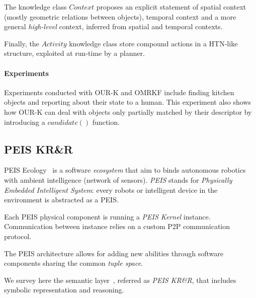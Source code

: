 The knowledge class $Context$ proposes an explicit statement of spatial context
(mostly geometric relations between objects), temporal context and a more
general \emph{high-level} context, inferred from spatial and temporal contexts.

Finally, the $Activity$ knowledge class store compound actions in a HTN-like
structure, exploited at run-time by a planner.

\paragraph{Experiments} Experiments conducted with OUR-K and OMRKF include
finding kitchen objects and reporting about their state to a human.  This
experiment also shows how OUR-K can deal with objects only partially matched by
their descriptor by introducing a $candidate()$ function.

\subsection{PEIS KR\&R}
\label{sect|peis-ecology}


{\sc PEIS Ecology}~\cite{Saffiotti2005} is a software \emph{ecosystem} that aim to binds autonomous
robotics with ambient intelligence (network of sensors). \emph{PEIS} stands for
\emph{Physically Embedded Intelligent System}: every robots or intelligent
device in the environment is abstracted as a PEIS.

Each PEIS physical component is running a \emph{PEIS Kernel} instance. Communication
between instance relies on a custom P2P communication protocol.

The PEIS architecture allows for adding new abilities through software components sharing the common \emph{tuple space}.

We survey here the semantic layer~\cite{Daoutis2009}, referred as \emph{PEIS KR\&R}, that includes symbolic representation and reasoning.


